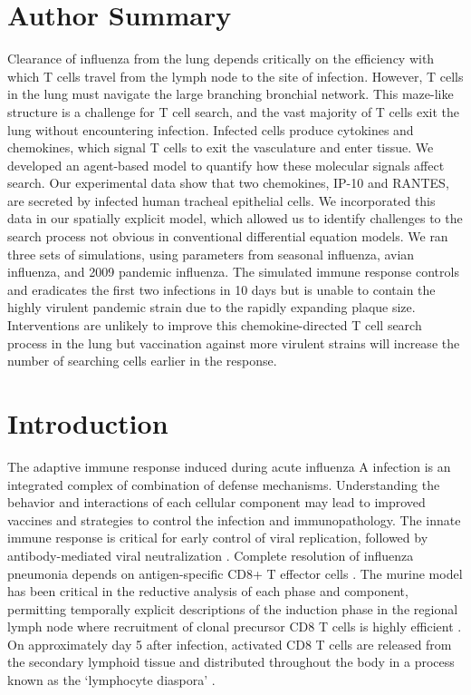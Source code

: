 \documentclass[10pt]{article}
\begin{document}
\section*{Author Summary}

Clearance of influenza from the lung depends critically on the efficiency with which T cells travel from the lymph node to the site of infection.  However, T cells in the lung must navigate the large branching bronchial network.  This maze-like structure is a challenge for T cell search, and the vast majority of T cells exit the lung without encountering infection.  Infected cells produce cytokines and chemokines, which signal T cells to exit the vasculature and enter tissue.  We developed an agent-based model to quantify how these molecular signals affect search.  Our experimental data show that two chemokines, IP-10 and RANTES, are secreted by infected human tracheal epithelial cells.  We incorporated this data in our spatially explicit model, which allowed us to identify challenges to the search process not obvious in conventional differential equation models.  We ran three sets of simulations, using parameters from seasonal influenza, avian influenza, and 2009 pandemic influenza.  The simulated immune response controls and eradicates the first two infections in 10 days but is unable to contain the highly virulent pandemic strain due to the rapidly expanding plaque size.  Interventions are unlikely to improve this chemokine-directed T cell search process in the lung but vaccination against more virulent strains will increase the number of searching cells earlier in the response.

\section*{Introduction}

The adaptive immune response induced during acute influenza A infection is an integrated complex of combination of defense mechanisms.  Understanding the behavior and interactions of each cellular component may lead to improved vaccines and strategies to control the infection and immunopathology.   The innate immune response is critical for early control of viral replication, followed by antibody-mediated viral neutralization \cite{Kohlmeier2009a, Joo2008, Oslund2011}.   Complete resolution of influenza pneumonia depends on antigen-specific CD8+ T effector cells \cite{Cerwenka1999, Kim2011}.  The murine model has been critical in the reductive analysis of each phase and component, permitting temporally explicit descriptions of the induction phase in the regional lymph node \cite{Miller2003, Allan2006, Ingulli2009} where recruitment of clonal precursor CD8 T cells is highly efficient \cite{VanHeijst2009}.   On approximately day 5 after infection, activated CD8 T cells are released from the secondary lymphoid tissue \cite{Miao2010a} and distributed throughout the body in a process known as the ‘lymphocyte diaspora’ \cite{Marshall2001}.
\end{document}
